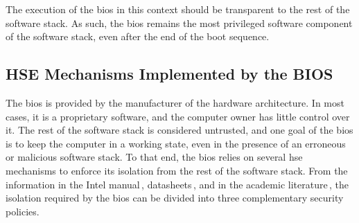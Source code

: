 The execution of the \ac{bios} in this context should be transparent to the rest
of the software stack.
%
As such, the \ac{bios} remains the most privileged software component of the
software stack, even after the end of the boot sequence.

\subsection{HSE Mechanisms Implemented by the BIOS}
\label{subsec:usecase:firm:sec}

The \ac{bios} is provided by the manufacturer of the hardware architecture.
%
In most cases, it is a proprietary software, and the computer owner has little
control over it.
%
The rest of the software stack is considered untrusted, and one goal of the
\ac{bios} is to keep the computer in a working state, even in the presence of an
erroneous or malicious software stack.
%
To that end, the \ac{bios} relies on several \ac{hse} mechanisms to enforce its
isolation from the rest of the software stack.
%
%
From the information in the Intel manual\,\cite{intel2014manual},
datasheets\,\cite{intel2009mch,intel2012pch}, and in the academic
literature\,\cite{bulygin2014summary}, the isolation required by the \ac{bios}
can be divided into three complementary security policies.

